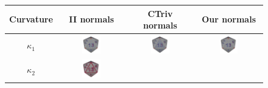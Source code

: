 \documentclass[runningheads]{llncs}
\begin{document}



    \begin{figure}
      \begin{center}
        \begin{tabular}{|c||c|c|c|} \hline
          Curvature & II normals & CTriv normals & Our normals \\ \hline \hline
          $\kappa_1$&
          \includegraphics[width=0.3\textwidth]{pictures/d20-k1-II}&
          \includegraphics[width=0.3\textwidth]{pictures/d20-k1-CTriv}&
          \includegraphics[width=0.3\textwidth]{pictures/d20-k1-NV}\\ \hline
          $\kappa_2$&
          \includegraphics[width=0.3\textwidth]{pictures/d20-k2-II}&

\end{tabular}
\end{center}
\end{figure}
\end{document}
